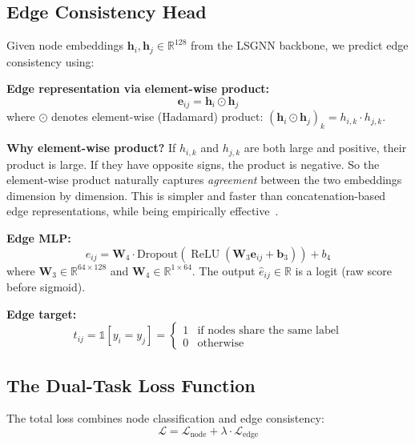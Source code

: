 \documentclass[conference]{IEEEtran}
\newcommand{\R}{\mathbb{R}}
\newcommand{\Loss}{\mathcal{L}}
\newcommand{\vect}[1]{\bm{#1}}
\newcommand{\mat}[1]{\mathbf{#1}}
\DeclareMathOperator{\ReLU}{ReLU}
\begin{document}
\subsection{Edge Consistency Head}

Given node embeddings $\vect{h}_i, \vect{h}_j \in \R^{128}$ from the LSGNN backbone, we predict edge consistency using:

\textbf{Edge representation via element-wise product:}
\begin{equation}
    \vect{e}_{ij} = \vect{h}_i \odot \vect{h}_j
\end{equation}
where $\odot$ denotes element-wise (Hadamard) product: $(\vect{h}_i \odot \vect{h}_j)_k = h_{i,k} \cdot h_{j,k}$.

\textbf{Why element-wise product?} If $h_{i,k}$ and $h_{j,k}$ are both large and positive, their product is large. If they have opposite signs, the product is negative. So the element-wise product naturally captures \emph{agreement} between the two embeddings dimension by dimension. This is simpler and faster than concatenation-based edge representations, while being empirically effective~\cite{you2020graph}.

\textbf{Edge MLP:}
\begin{equation}
    \hat{e}_{ij} = \mat{W}_4 \cdot \text{Dropout}\!\left(\ReLU\!\left(\mat{W}_3 \vect{e}_{ij} + \vect{b}_3\right)\right) + b_4
\end{equation}
where $\mat{W}_3 \in \R^{64 \times 128}$ and $\mat{W}_4 \in \R^{1 \times 64}$. The output $\hat{e}_{ij} \in \R$ is a logit (raw score before sigmoid).

\textbf{Edge target:}
\begin{equation}
    t_{ij} = \mathbb{1}[y_i = y_j] = \begin{cases} 1 & \text{if nodes share the same label} \\ 0 & \text{otherwise} \end{cases}
\end{equation}

\subsection{The Dual-Task Loss Function}

The total loss combines node classification and edge consistency:
\begin{equation}
\boxed{\Loss = \Loss_{\text{node}} + \lambda \cdot \Loss_{\text{edge}}}
\end{equation}
\end{document}
